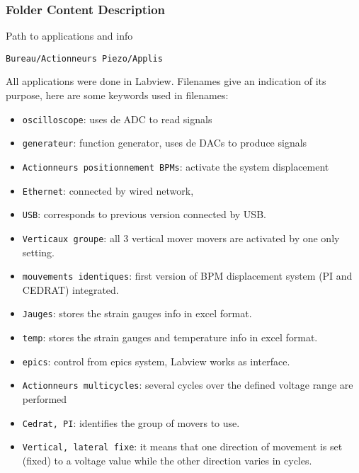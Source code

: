 \subsubsection{Folder Content Description}\par
Path to applications and info\par
\verb?Bureau/Actionneurs Piezo/Applis?\par
All applications were done in Labview. Filenames give an indication of its purpose, here are some keywords used in filenames:\par
\begin{itemize}
\item \verb?oscilloscope?: uses de ADC to read signals
\item \verb?generateur?: function generator, uses de DACs to produce signals
\item \verb?Actionneurs positionnement BPMs?: activate the system displacement
\item \verb?Ethernet?: connected by wired network,
\item \verb?USB?: corresponds to previous version connected by USB.
\item \verb?Verticaux groupe?: all 3 vertical mover movers are activated by one only setting.
\item \verb?mouvements identiques?: first version of BPM displacement system (PI and CEDRAT) integrated.
\item \verb?Jauges?: stores the strain gauges info in excel format.
\item \verb?temp?: stores the strain gauges and temperature info in excel format.
\item \verb?epics?: control from epics system, Labview works as interface.
\item \verb?Actionneurs multicycles?: several cycles over the defined voltage range are performed
\item \verb?Cedrat, PI?: identifies the group of movers to use.
\item \verb?Vertical, lateral fixe?: it means that one direction of movement is set (fixed) to a voltage value while the other direction varies in cycles.
\end{itemize}
